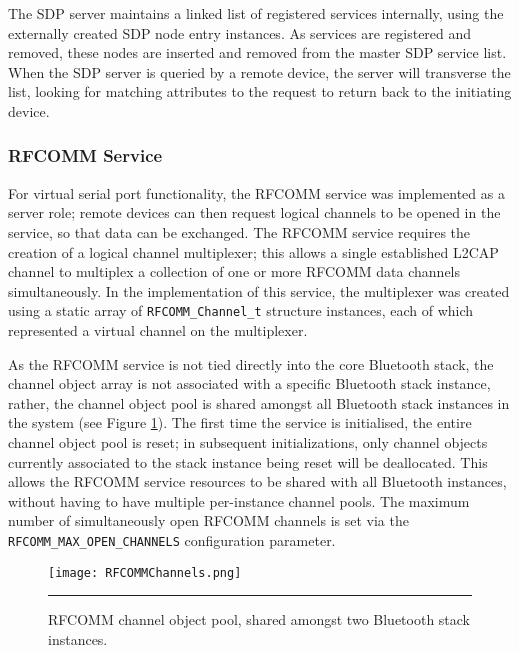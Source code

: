 

The SDP server maintains a linked list of registered services internally, using the externally created SDP node entry instances. As services are registered and removed, these nodes are inserted and removed from the master SDP service list. When the SDP server is queried by a remote device, the server will transverse the list, looking for matching attributes to the request to return back to the initiating device.

\subsubsection{RFCOMM Service}

For virtual serial port functionality, the RFCOMM service was implemented as a server role; remote devices can then request logical channels to be opened in the service, so that data can be exchanged. The RFCOMM service requires the creation of a logical channel multiplexer; this allows a single established L2CAP channel to multiplex a collection of one or more RFCOMM data channels simultaneously. In the implementation of this service, the multiplexer was created using a static array of \lstinline{RFCOMM_Channel_t} structure instances, each of which represented a virtual channel on the multiplexer.

As the RFCOMM service is not tied directly into the core Bluetooth stack, the channel object array is not associated with a specific Bluetooth stack instance, rather, the channel object pool is shared amongst all Bluetooth stack instances in the system (see Figure \ref{fig:rfcommchannelpool}). The first time the service is initialised, the entire channel object pool is reset; in subsequent initializations, only channel objects currently associated to the stack instance being reset will be deallocated. This allows the RFCOMM service resources to be shared with all Bluetooth instances, without having to have multiple per-instance channel pools. The maximum number of simultaneously open RFCOMM channels is set via the \lstinline{RFCOMM_MAX_OPEN_CHANNELS} configuration parameter.

\begin{figure}[tbph]
	\vspace{1em}
	\centering
		\texttt{[image: RFCOMMChannels.png]}
	\rule{35em}{0.5pt}
	\caption[Shared RFCOMM channel pool]{RFCOMM channel object pool, shared amongst two Bluetooth stack instances.}
	\label{fig:rfcommchannelpool}
\end{figure}

